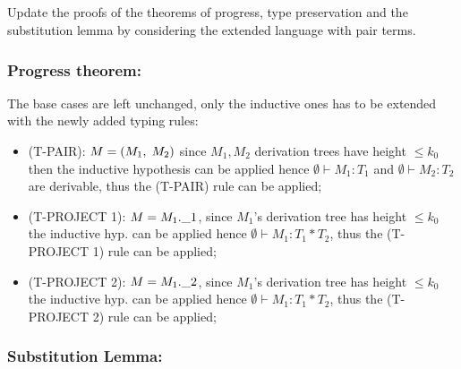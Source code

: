 \subsection{}
Update the proofs of the theorems of progress, type preservation and the substitution lemma by
considering the extended language with pair terms.

\subsubsection*{Progress theorem:}

The base cases are left unchanged, only the inductive ones has to be extended with the newly
added typing rules:
\begin{itemize}
	\item (T-PAIR): $M = (M_1,\;M_2)$ since $M_1, M_2$ derivation trees have height
	      $\le k_0$ then the inductive hypothesis can be applied hence $\emptyset \vdash M_1 : T_1$
	      and $\emptyset \vdash M_2 : T_2$ are derivable, thus the (T-PAIR) rule can be applied;
	\item (T-PROJECT 1): $M = M_1.\_1$, since $M_1$'s derivation tree has height $\le k_0$
	      the inductive hyp. can be applied hence $\emptyset \vdash M_1: T_1 \ast T_2$, thus the
	      (T-PROJECT 1) rule can be applied;
	\item (T-PROJECT 2): $M = M_1.\_2$, since $M_1$'s derivation tree has height $\le k_0$
	      the inductive hyp. can be applied hence $\emptyset \vdash M_1: T_1 \ast T_2$, thus the
	      (T-PROJECT 2) rule can be applied;
\end{itemize}

\subsubsection*{Substitution Lemma:}


